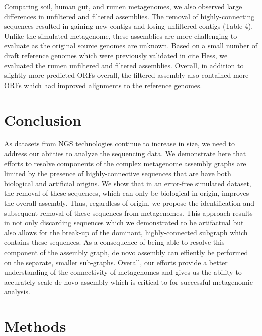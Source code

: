 \documentclass[11pt]{article} %
\begin{document}
Comparing soil, human gut, and rumen metagenomes, we also observed large differences in unfiltered and filtered assemblies.  The removal of highly-connecting sequences resulted in gaining new contigs and losing unfiltered contigs (Table 4).  Unlike the simulated metagenome, these assemblies are more challenging to evaluate as the original source genomes are unknown.  Based on a small number of draft reference genomes which were previously validated in cite Hess, we evaluated the rumen unfiltered and filtered assemblies.  Overall, in addition to slightly more predicted ORFs overall, the filtered assembly also contained more ORFs which had improved alignments to the reference genomes.  
	
\section{Conclusion}

As datasets from NGS technologies continue to increase in size, we need to address our abiities to analyze the sequencing data.  We demonstrate here that efforts to resolve components of the complex metagenome assembly graphs are limited by the presence of highly-connective sequences that are have both biological and artificial origins.  We show that in an error-free simulated dataset, the removal of these sequences, which can only be biological in origin, improves the overall assembly.  Thus, regardless of origin, we propose the identification and subsequent removal of these sequences from metagenomes.  This approach results in not only discarding sequences which we demonstrated to be artifactual but also allows for the break-up of the dominant, highly-connected subgraph which contains these sequences.  As a consequence of being able to resolve this component of the assembly graph, de novo assembly can effiently be performed on the separate, smaller sub-graphs.  Overall, our efforts provide a better understanding of the connectivity of metagenomes and gives us the ability to accurately scale de novo assembly which is critical to for successful metagenomic analysis.  



\section{Methods}
\end{document}
